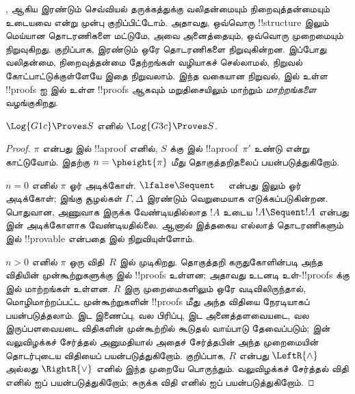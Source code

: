 \documentclass[../../../include/open-logic-section]{subfiles}
\begin{document}


,  ஆகிய இரண்டும் செவ்வியல் தருக்கத்துக்கு
வலிதன்மையும் நிறைவுத்தன்மையும் உடையவை என்று முன்பு குறிப்பிட்டோம்.
அதாவது, ஒவ்வொரு !!{structure} இலும் மெய்யான
தொடரணிகளை மட்டுமே, அவை அனைத்தையும், ஒவ்வொரு முறைமையும்
நிறுவுகிறது. குறிப்பாக, இரண்டும் ஒரே தொடரணிகளை நிறுவுகின்றன.
இப்போது வலிதன்மை, நிறைவுத்தன்மை தேற்றங்கள் வழியாகச்
செல்லாமல், நிறுவல் கோட்பாட்டுக்குள்ளேயே இதை நிறுவலாம்.
இந்த வகையான நிறுவல்,  இல் உள்ள
!!{proof}s ஐ  இல் உள்ள !!{proof}s ஆகவும்
மறுதிசையிலும் மாற்றும் \emph{மாற்றங்களை} வழங்குகிறது.

\begin{prop}
$\Log{G1c} \Proves S$ எனில் $\Log{G3c} \Proves S$.
\end{prop}

\begin{proof}
  $\pi$ என்பது  இல் !!a{proof} எனில்,
  $S$ க்கு  இல் !!a{proof}~$\pi'$ உண்டு
  என்று காட்டுவோம். இதற்கு $n = \pheight{\pi}$
  மீது தொகுத்தறிதலைப் பயன்படுத்துகிறோம்.

  $n = 0$ எனில் $\pi$ ஓர் அடிக்கோள்.
  $\lfalse \Sequent \quad$ என்பது 
  இலும் ஓர் அடிக்கோள்; இங்கு சூழல்கள் $\Gamma,
  \Delta$ இரண்டும் வெறுமையாக எடுக்கப்படுகின்றன.
  பொதுவான, அணுவாக இருக்க வேண்டியதில்லாத $!A$ உடைய
  $!A \Sequent !A$ என்பது  இன்
  அடிக்கோளாக வேண்டியதில்லை. ஆனால் இத்தகைய
  எல்லாத் தொடரணிகளும்  இல்
  !!{provable} என்பதை
   இல் நிறுவியுள்ளோம்.

  $n>0$ எனில் $\pi$ ஒரு விதி~$R$ இல் முடிகிறது.
  தொகுத்தறி கருதுகோளின்படி அந்த விதியின்
  முன்கூற்றுகளுக்கு  இல் !!{proof}s
  உள்ளன; அதாவது உடனடி உள்-!!{proof}s க்கு
   இல் மாற்றங்கள் உள்ளன.
  $R$ இரு முறைமைகளிலும் ஒரே வடிவிலிருந்தால்,
  மொழிமாற்றப்பட்ட முன்கூற்றுகளின் !!{proof}s
  மீது அந்த விதியை நேரடியாகப் பயன்படுத்தலாம்.
  இட இணைப்பு, வல பிரிப்பு, இட அனைத்தளவையடை,
  வல இருப்பளவையடை விதிகளின் 
  முன்கூற்றில் கூடுதல் வாய்பாடு தேவைப்படும்;
   இன் வலுவிழக்கச்
  சேர்த்தல் அனுமதியால் அதைச் சேர்த்தபின் அந்த
  முறைமையின் தொடர்புடைய விதியைப் பயன்படுத்துகிறோம்.
  குறிப்பாக, $R$ என்பது $\LeftR{\land}$ அல்லது
  $\RightR{\lor}$ எனில் இந்த முறையே பொருந்தும்.
  வலுவிழக்கச் சேர்த்தல் விதி எனில்
   ஐப் பயன்படுத்துகிறோம்;
  சுருக்க விதி எனில் 
  ஐப் பயன்படுத்துகிறோம்.
\end{proof}
\end{document}
